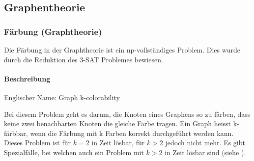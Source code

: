 \subsection{Graphentheorie}\label{graph_theory}

	\subsubsection{Färbung (Graphtheorie)}\label{colarability_graph_theory}
	Die Färbung in der Graphtheorie ist ein \gls{np}-vollständiges Problem. Dies wurde durch die Reduktion des 3-SAT Problemes bewiesen.

	\paragraph{Beschreibung}
	Englischer Name: Graph k-colorability

	Bei diesem Problem geht es darum, die Knoten eines Graphens so zu färben, dass keine zwei benachbarten Knoten die gleiche Farbe tragen. Ein Graph heisst k-färbbar, wenn die 
Färbung mit k Farben korrekt durchgeführt werden kann. Dieses Problem ist für $k = 2$ in  Zeit lösbar, für $k > 2$ jedoch nicht mehr. Es gibt Spezialfälle, 
bei welchen auch ein Problem mit $k > 2$ in  Zeit lösbar sind (siehe \cite{garey1979computers}).

